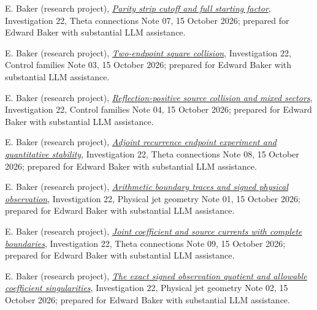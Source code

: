 \documentclass[11pt]{article}
\numberwithin{equation}{section}
\theoremstyle{definition}
\theoremstyle{remark}
\newcommand{\researchnote}[2]{\href{../../papers/investigations-2/active/22_theta_manifold_geometry/#1}{#2}}
\begin{document}
\begin{thebibliography}{99}
E. Baker (research project),
\researchnote{notes/03_theta_bundles_and_connections/07_PARITY_STRIP_CUTOFF_AND_FULL_STARTING_FACTOR_20261015.md}{\emph{Parity strip cutoff and full starting factor}},
Investigation 22, Theta connections Note 07, 15 October 2026;
prepared for Edward Baker with substantial LLM assistance.

E. Baker (research project),
\researchnote{notes/05_control_families/03_TWO_ENDPOINT_SQUARE_COLLISION_20261015.md}{\emph{Two-endpoint square collision}},
Investigation 22, Control families Note 03, 15 October 2026;
prepared for Edward Baker with substantial LLM assistance.

E. Baker (research project),
\researchnote{notes/05_control_families/04_REFLECTION_POSITIVE_SOURCE_COLLISION_AND_MIXED_SECTORS_20261015.md}{\emph{Reflection-positive source collision and mixed sectors}},
Investigation 22, Control families Note 04, 15 October 2026;
prepared for Edward Baker with substantial LLM assistance.

E. Baker (research project),
\researchnote{notes/03_theta_bundles_and_connections/08_ADJOINT_RECURRENCE_ENDPOINT_EXPERIMENT_20261015.md}{\emph{Adjoint recurrence endpoint experiment and quantitative stability}},
Investigation 22, Theta connections Note 08, 15 October 2026;
prepared for Edward Baker with substantial LLM assistance.

E. Baker (research project),
\researchnote{notes/01_physical_jet_geometry/01_ARITHMETIC_BOUNDARY_TRACE_AND_SIGNED_OBSERVATION_20261015.md}{\emph{Arithmetic boundary traces and signed physical observation}},
Investigation 22, Physical jet geometry Note 01, 15 October 2026;
prepared for Edward Baker with substantial LLM assistance.


E. Baker (research project),
\researchnote{notes/03_theta_bundles_and_connections/09_JOINT_SOURCE_CURRENT_AND_POLYNOMIAL_OBSTRUCTION_20261015.md}{\emph{Joint coefficient and source currents with complete boundaries}},
Investigation 22, Theta connections Note 09, 15 October 2026;
prepared for Edward Baker with substantial LLM assistance.

E. Baker (research project),
\researchnote{notes/01_physical_jet_geometry/02_SIGNED_OBSERVATION_QUOTIENT_AND_COEFFICIENT_SINGULARITIES_20261015.md}{\emph{The exact signed observation quotient and allowable coefficient singularities}},
Investigation 22, Physical jet geometry Note 02, 15 October 2026;
prepared for Edward Baker with substantial LLM assistance.


\end{thebibliography}
\end{document}
